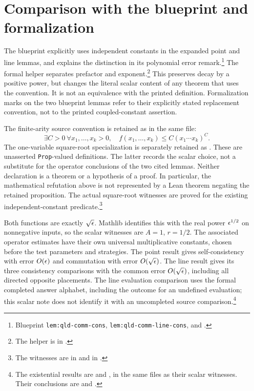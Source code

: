\documentclass[11pt]{article}
\begin{document}
\section{Comparison with the blueprint and formalization}

The blueprint explicitly uses independent constants in the expanded point
and line lemmas, and explains the distinction in its polynomial error
remark.\footnote{Blueprint \texttt{lem:qld-comm-cons},
\texttt{lem:qld-comm-line-cons}, and
.}
The formal helper separates prefactor and exponent.\footnote{The helper is
 in
.}
This preserves decay by a positive power, but changes the literal scalar
content of any theorem that uses the convention. It is not an equivalence
with the printed definition. Formalization marks on the two blueprint lemmas
refer to their explicitly stated replacement convention, not to the printed
coupled-constant assertion.

The finite-arity source convention is retained as
 in the same file:
\[
 \exists C>0\ \forall x_1,\ldots,x_k>0,\quad
 f(x_1,\ldots,x_k)\leq C(x_1\cdots x_k)^C.
\]
The one-variable square-root specialization is separately retained as
. These are unasserted
\texttt{Prop}-valued definitions. The latter records the scalar choice,
not a substitute for the operator conclusions of the two cited lemmas.
Neither declaration is a theorem or a hypothesis of a proof. In particular,
the mathematical refutation above is not represented by a Lean theorem
negating the retained proposition. The actual square-root witnesses are
proved for the existing independent-constant predicate.\footnote{The witnesses are
 in
 and
 in
.}

Both functions are exactly $\sqrt{\epsilon}$. Mathlib identifies this with the
real power $\epsilon^{1/2}$ on nonnegative inputs, so the scalar witnesses are
$A=1$, $r=1/2$. The associated operator estimates have their own universal
multiplicative constants, chosen before the test parameters and strategies.
The point result gives self-consistency with error $O(\epsilon)$ and
commutation with error $O(\sqrt{\epsilon})$. The line result gives its three
consistency comparisons with the common error $O(\sqrt{\epsilon})$, including
all directed opposite placements. The line evaluation comparison uses the
formal completed answer alphabet, including the outcome for an undefined
evaluation; this scalar note does not identify it with an uncompleted
source comparison.\footnote{The existential results are
 and , in the same
files as their scalar witnesses. Their conclusions are
 and .}
\end{document}
